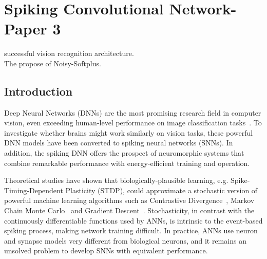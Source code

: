 \chapter{Spiking Convolutional Network-Paper 3}
\label{cha:Conv}
successful vision recognition architecture.\\
The propose of Noisy-Softplus.
\section{Introduction}
Deep Neural Networks (DNNs) are the most promising research field in computer vision, even exceeding human-level performance on image classification tasks~\cite{he2015delving}.
	To investigate whether brains might work similarly on vision tasks, these powerful DNN models have been converted to spiking neural networks (SNNs).
	In addition, the spiking DNN offers the prospect of neuromorphic systems that combine remarkable performance with energy-efficient training and operation.
	
	Theoretical studies have shown that biologically-plausible learning, e.g. Spike-Timing-Dependent Plasticity (STDP), could approximate a stochastic version of powerful machine learning algorithms
	such as 
	Contrastive Divergence~\cite{neftci2013event}, Markov Chain Monte Carlo~\cite{buesing2011neural} and Gradient Descent~\cite{o2016deep}.
	Stochasticity, in contrast with the continuously differentiable functions used by ANNs, is intrinsic to the event-based spiking process, making network training difficult.
	In practice, ANNs use neuron and synapse models very different from biological neurons, and it remains an unsolved problem to develop SNNs with equivalent performance.
	
	
